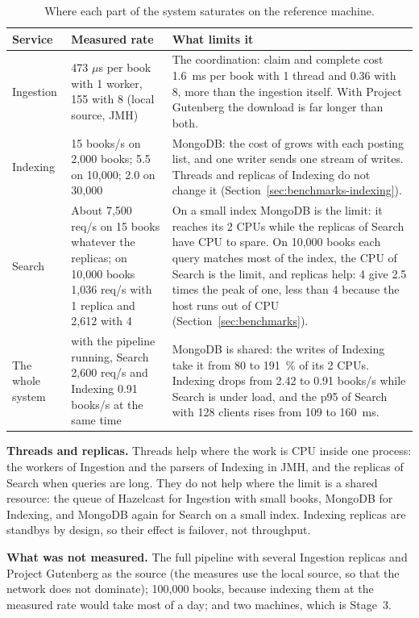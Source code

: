 \begin{table}[H]
\centering\small
\begin{tabularx}{\linewidth}{@{}L{1.9cm}L{4.4cm}X@{}}
\toprule
\textbf{Service} & \textbf{Measured rate} & \textbf{What limits it} \\
\midrule
Ingestion & 473 $\mu$s per book with 1 worker, 155 with 8 (local source, JMH) &
  The coordination: claim and complete cost 1.6~ms per book with 1 thread and 0.36 with 8, more than the ingestion
  itself. With Project Gutenberg the download is far longer than both. \\
Indexing & 15 books/s on 2,000 books; 5.5 on 10,000; 2.0 on 30,000 &
  MongoDB: the cost of  grows with each posting list, and one writer sends one stream of writes.
  Threads and replicas of Indexing do not change it (Section~\ref{sec:benchmarks-indexing}). \\
Search & About 7,500 req/s on 15 books whatever the replicas; on 10,000 books 1,036 req/s with 1 replica and
  2,612 with 4 &
  On a small index MongoDB is the limit: it reaches its 2 CPUs while the replicas of Search have CPU to spare. On
  10,000 books each query matches most of the index, the CPU of Search is the limit, and replicas help: 4 give 2.5
  times the peak of one, less than 4 because the host runs out of CPU (Section~\ref{sec:benchmarks}). \\
The whole system & with the pipeline running, Search 2,600 req/s and Indexing 0.91 books/s at the same time &
  MongoDB is shared: the writes of Indexing take it from 80 to 191~\% of its 2 CPUs. Indexing drops from 2.42 to
  0.91 books/s while Search is under load, and the p95 of Search with 128 clients rises from 109 to 160~ms. \\
\bottomrule
\end{tabularx}
\caption{Where each part of the system saturates on the reference machine.}
\label{tab:bottlenecks}
\end{table}

\textbf{Threads and replicas.} Threads help where the work is CPU inside one process: the workers of Ingestion and the
parsers of Indexing in JMH, and the replicas of Search when queries are long. They do not help where the limit is a shared
resource: the queue of Hazelcast for Ingestion with small books, MongoDB for Indexing, and MongoDB again for Search
on a small index. Indexing replicas are
standbys by design, so their effect is failover, not throughput.

\textbf{What was not measured.} The full pipeline with several Ingestion replicas and Project Gutenberg as the source
(the measures use the local source, so that the network does not dominate); 100,000 books, because indexing them at the
measured rate would take most of a day; and two machines, which is Stage~3.

